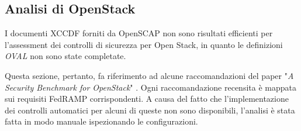 \documentclass[../main.tex]{subfiles}
\begin{document}
\subsection{Analisi di OpenStack}
I documenti XCCDF forniti da OpenSCAP non sono risultati efficienti per l'assessment dei controlli di sicurezza per Open Stack, in quanto le definizioni \textit{OVAL} non sono state completate.

Questa sezione, pertanto, fa riferimento ad alcune raccomandazioni del paper "\textit{A Security Benchmark for OpenStack}" \cite{MyPaper}. Ogni raccomandazione recensita è mappata sui requisiti FedRAMP corrispondenti. A causa del fatto che l'implementazione dei controlli automatici per alcuni di queste non sono disponibili, l'analisi è stata fatta in modo manuale ispezionando le configurazioni.
\end{document}
